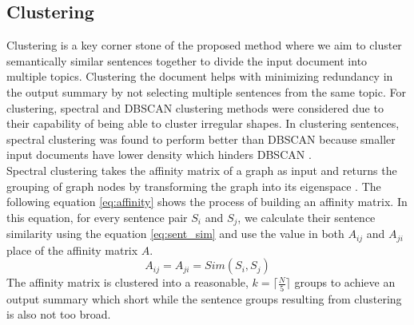 \subsection{Clustering}\label{subsec:clustering}
Clustering is a key corner stone of the proposed method where we aim to cluster semantically similar sentences together to divide the input document into multiple topics. Clustering the document helps with minimizing redundancy in the output summary by not selecting multiple sentences from the same topic. For clustering, spectral and DBSCAN clustering methods were considered due to their capability of being able to cluster irregular shapes. In clustering sentences, spectral clustering was found to perform better than DBSCAN because smaller input documents have lower density which hinders DBSCAN \cite{roychowdhury-etal-2022-spectral-base}.\\

Spectral clustering takes the affinity matrix of a graph as input and returns the grouping of graph nodes by transforming the graph into its eigenspace \cite{vonLuxburg-2007-spectral-tutorial}. The following equation \ref{eq:affinity} shows the process of building an affinity matrix. In this equation, for every sentence pair $S_i$ and $S_j$, we calculate their sentence similarity using the equation \ref{eq:sent_sim} and use the value in both $A_{ij}$ and $A_{ji}$ place of the affinity matrix $A$.
\begin{equation}\label{eq:affinity}
    A_{ij}=A_{ji}=Sim(S_i,S_j)
\end{equation}
The affinity matrix is clustered into a reasonable, $k=\lceil\frac{N}{5}\rceil$ groups to achieve an output summary which short while the sentence groups resulting from clustering is also not too broad.

